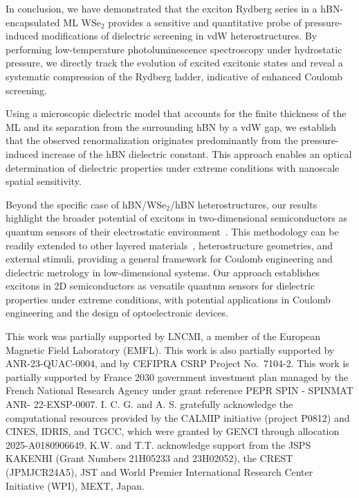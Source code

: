 \documentclass[twocolumn,showpacs,preprintnumbers,prl,fleqn,superscriptaddress]{revtex4-2}
\begin{document}
In conclusion, we have demonstrated that the exciton Rydberg series in a hBN-encapsulated ML WSe$_2$ provides a sensitive and quantitative probe of pressure-induced modifications of dielectric screening in vdW heterostructures. By performing low-temperature photoluminescence spectroscopy under hydrostatic pressure, we directly track the evolution of excited excitonic states and reveal a systematic compression of the Rydberg ladder, indicative of enhanced Coulomb screening.

Using a microscopic dielectric model that accounts for the finite thickness of the ML and its separation from the surrounding hBN by a vdW gap, we establish that the observed renormalization originates predominantly from the pressure-induced increase of the hBN dielectric constant. This approach enables an optical determination of dielectric properties under extreme conditions with nanoscale spatial sensitivity.

Beyond the specific case of hBN/WSe$_2$/hBN heterostructures, our results highlight the broader potential of excitons in two-dimensional semiconductors as quantum sensors of their electrostatic environment~\cite{Popert2022,He2024}. This methodology can be readily extended to other layered materials~\cite{Castellanos2011,hay2026}, heterostructure geometries, and external stimuli, providing a general framework for Coulomb engineering and dielectric metrology in low-dimensional systems. Our approach establishes excitons in 2D semiconductors as versatile quantum sensors for dielectric properties under extreme conditions, with potential applications in Coulomb engineering and the design of optoelectronic devices.

\begin{acknowledgements}
This work was partially supported by LNCMI, a member of the European Magnetic Field Laboratory (EMFL). This work is also partially supported by ANR-23-QUAC-0004, and by CEFIPRA CSRP Project No.~7104-2. This work is partially supported by France 2030 government investment plan managed by the French National Research Agency under grant reference PEPR SPIN - SPINMAT ANR- 22-EXSP-0007. I. C. G. and A. S. gratefully acknowledge the computational resources provided by the CALMIP initiative (project P0812) and CINES, IDRIS, and TGCC, which were granted by GENCI through allocation 2025-A0180906649. K.W. and T.T. acknowledge support from the JSPS KAKENHI (Grant Numbers 21H05233 and 23H02052), the CREST (JPMJCR24A5), JST and World Premier International Research Center Initiative (WPI), MEXT, Japan.
\end{acknowledgements}
\end{document}
